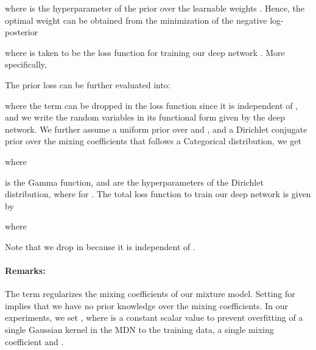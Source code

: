 \documentclass[10pt,twocolumn,letterpaper]{article}
\begin{document}
 
 \noindent where  is the hyperparameter of the prior over the learnable weights . Hence, the optimal weight  can be obtained from the minimization of the negative log-posterior
 
 
 \noindent where  is taken to be the loss function for training our deep network . More specifically, 
 
 \noindent The prior loss  can be further evaluated into:
 
 \noindent where the term  can be dropped in the loss function since it is independent of , and we write the random variables  in its functional form  given by the deep network. We further assume a uniform prior over  and , and a Dirichlet conjugate prior over the mixing coefficients  that follows a Categorical distribution, we get 

\noindent where

 \noindent  is the Gamma function, and  are the hyperparameters of the Dirichlet distribution, where  for . The total loss function to train our deep network is given by
 
 \noindent where

Note that we drop  in  because it is independent of .
 






\paragraph{Remarks:} The term  regularizes the mixing coefficients of our mixture model. Setting  for  implies that we have no prior knowledge over the mixing coefficients. In our experiments, we set , where  is a constant scalar value to prevent overfitting of a single Gaussian kernel in the MDN to the training data, \ie a single mixing coefficient  and .
\end{document}

